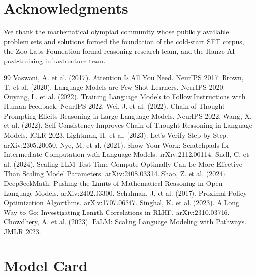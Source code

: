 \documentclass[11pt,a4paper]{article}
\begin{document}
\section*{Acknowledgments}

We thank the mathematical olympiad community whose publicly available problem sets and
solutions formed the foundation of the cold-start SFT corpus, the Zoo Labs Foundation
formal reasoning research team, and the Hanzo AI post-training infrastructure team.

\begin{thebibliography}{99}
 Vaswani, A. et al. (2017). Attention Is All You Need. NeurIPS 2017.
 Brown, T. et al. (2020). Language Models are Few-Shot Learners. NeurIPS 2020.
 Ouyang, L. et al. (2022). Training Language Models to Follow Instructions with Human Feedback. NeurIPS 2022.
 Wei, J. et al. (2022). Chain-of-Thought Prompting Elicits Reasoning in Large Language Models. NeurIPS 2022.
 Wang, X. et al. (2022). Self-Consistency Improves Chain of Thought Reasoning in Language Models. ICLR 2023.
 Lightman, H. et al. (2023). Let's Verify Step by Step. arXiv:2305.20050.
 Nye, M. et al. (2021). Show Your Work: Scratchpads for Intermediate Computation with Language Models. arXiv:2112.00114.
 Snell, C. et al. (2024). Scaling LLM Test-Time Compute Optimally Can Be More Effective Than Scaling Model Parameters. arXiv:2408.03314.
 Shao, Z. et al. (2024). DeepSeekMath: Pushing the Limits of Mathematical Reasoning in Open Language Models. arXiv:2402.03300.
 Schulman, J. et al. (2017). Proximal Policy Optimization Algorithms. arXiv:1707.06347.
 Singhal, K. et al. (2023). A Long Way to Go: Investigating Length Correlations in RLHF. arXiv:2310.03716.
 Chowdhery, A. et al. (2023). PaLM: Scaling Language Modeling with Pathways. JMLR 2023.
\end{thebibliography}

\appendix

\section{Model Card}
\end{document}
